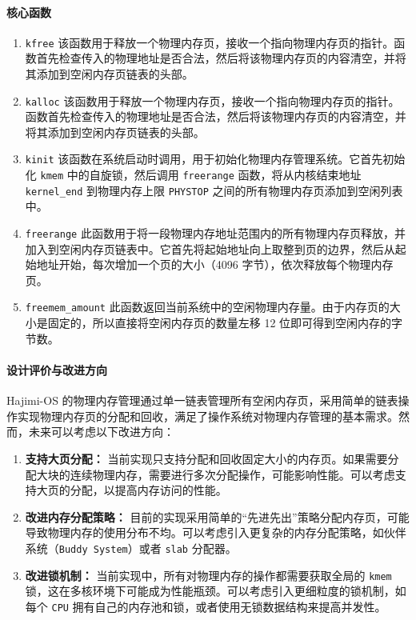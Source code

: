 \documentclass[UTF8]{article}
\begin{document}
\paragraph{核心函数}
\begin{enumerate}[label=\textbf{\arabic*}., wide, labelwidth=!, labelindent=0pt]
  \item \texttt{kfree} 该函数用于释放一个物理内存页，接收一个指向物理内存页的指针。函数首先检查传入的物理地址是否合法，然后将该物理内存页的内容清空，并将其添加到空闲内存页链表的头部。
        
  \item \texttt{kalloc} 该函数用于释放一个物理内存页，接收一个指向物理内存页的指针。函数首先检查传入的物理地址是否合法，然后将该物理内存页的内容清空，并将其添加到空闲内存页链表的头部。
        
  \item \texttt{kinit} 该函数在系统启动时调用，用于初始化物理内存管理系统。它首先初始化 \texttt{kmem} 中的自旋锁，然后调用 \texttt{freerange} 函数，将从内核结束地址 \texttt{kernel\_end} 到物理内存上限 \texttt{PHYSTOP} 之间的所有物理内存页添加到空闲列表中。
        
  \item \texttt{freerange} 此函数用于将一段物理内存地址范围内的所有物理内存页释放，并加入到空闲内存页链表中。它首先将起始地址向上取整到页的边界，然后从起始地址开始，每次增加一个页的大小（4096 字节），依次释放每个物理内存页。
        
  \item \texttt{freemem\_amount} 此函数返回当前系统中的空闲物理内存量。由于内存页的大小是固定的，所以直接将空闲内存页的数量左移 12 位即可得到空闲内存的字节数。
        
\end{enumerate}


\paragraph{设计评价与改进方向\\}
Hajimi-OS 的物理内存管理通过单一链表管理所有空闲内存页，采用简单的链表操作实现物理内存页的分配和回收，满足了操作系统对物理内存管理的基本需求。然而，未来可以考虑以下改进方向：
\begin{enumerate}[label=\textbf{\arabic*}., wide, labelwidth=!, labelindent=0pt]
  \item \textbf{支持大页分配：} 当前实现只支持分配和回收固定大小的内存页。如果需要分配大块的连续物理内存，需要进行多次分配操作，可能影响性能。可以考虑支持大页的分配，以提高内存访问的性能。
  \item \textbf{改进内存分配策略：} 目前的实现采用简单的“先进先出”策略分配内存页，可能导致物理内存的使用分布不均。可以考虑引入更复杂的内存分配策略，如伙伴系统（\texttt{Buddy System}）或者 \texttt{slab} 分配器。
  \item \textbf{改进锁机制：} 当前实现中，所有对物理内存的操作都需要获取全局的 \texttt{kmem} 锁，这在多核环境下可能成为性能瓶颈。可以考虑引入更细粒度的锁机制，如每个 \texttt{CPU} 拥有自己的内存池和锁，或者使用无锁数据结构来提高并发性。
\end{enumerate}
\end{document}

